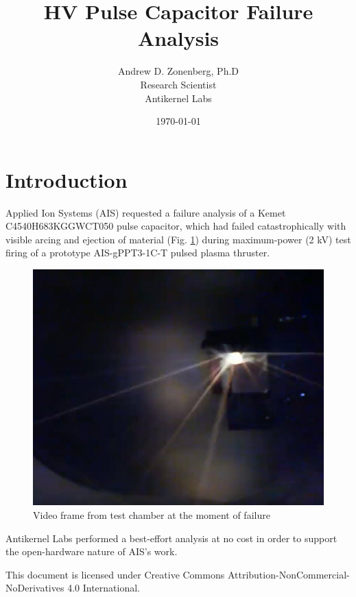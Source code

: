 \documentclass{article}
\begin{document}
\title{HV Pulse Capacitor Failure Analysis }
\author {Andrew D. Zonenberg, Ph.D \\ Research Scientist \\ Antikernel Labs}
\date{\today}
\maketitle

\section{Introduction}

Applied Ion Systems (AIS) requested a failure analysis of a Kemet C4540H683KGGWCT050 pulse capacitor, which had failed
catastrophically with visible arcing and ejection of material (Fig. \ref{failure}) during maximum-power (2 kV) test
firing of a prototype AIS-gPPT3-1C-T pulsed plasma thruster.

\begin{figure}[h]
\includegraphics[width=14cm,keepaspectratio]{cap-failure.jpg}
\caption{Video frame from test chamber at the moment of failure}
\label{failure}
\end{figure}

Antikernel Labs performed a best-effort analysis at no cost in order to support the open-hardware nature of AIS's work.

This document is licensed under Creative Commons Attribution-NonCommercial-NoDerivatives 4.0 International.

\pagebreak
\end{document}
